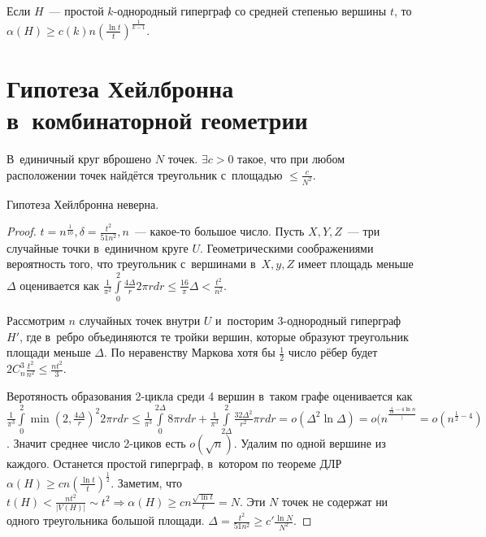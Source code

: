 \documentclass{article}
\begin{document}
\begin{corollary}
	Если $H$~--- простой $k$-однородный гиперграф со средней степенью вершины $t$,
	то $\alpha(H) \ge c(k) n \left( \frac{\ln t}{t}\right)^\frac{1}{k-1}$.
\end{corollary}

\section{Гипотеза Хейлбронна в~комбинаторной геометрии}

В~единичный круг вброшено $N$ точек. $\exists c > 0$ такое, что при любом
расположении точек найдётся треугольник с~площадью $\le \frac{c}{N^2}$.

\begin{claim}
	Гипотеза Хейлбронна неверна.
\end{claim}
\begin{proof}
	$t = n^{\frac{1}{10}}, \delta = \frac{t^2}{51n^2}, n$~--- какое-то большое
	число. Пусть $X, Y, Z$~--- три случайные точки в~единичном круге $U$.
	Геометрическими соображениями вероятность того, что треугольник с~вершинами
	в~$X, y, Z$ имеет площадь меньше $\Delta$ оценивается как
	$\frac{1}{\pi^2} \int\limits_0^2 \frac{4\Delta}{r} 2\pi r dr \le
	\frac{16}{\pi}\Delta < \frac{t^2}{n^2}$.

	Рассмотрим $n$ случайных точек внутри $U$ и~посторим 3-однородный гиперграф
	$H'$, где в~ребро объединяются те тройки вершин, которые образуют треугольник
	площади меньше $\Delta$. По неравенству Маркова хотя бы $\frac{1}{2}$ число
	рёбер будет $2C_n^3 \frac{t^2}{n^2} \le \frac{nt^2}{3}$.

	Веротяность образования 2-цикла среди 4 вершин в~таком графе оценивается как
	$\frac{1}{\pi^3} \int\limits_0^2 \min\left(2, \frac{4\Delta}{r}\right)^2 2\pi
	r dr \le \frac{1}{\pi^3} \int\limits_0^{2\Delta} 8\pi r dr +
	\frac{1}{\pi^3}\int\limits_{2\Delta}^2 \frac{32\Delta^2}{r^2}\pi r dr =
	o(\Delta^2 \ln \Delta) = o(n^\frac{\frac{4}{10}-4 \ln n}) = o(n^{\frac{1}{2} -
	4})$. Значит среднее число 2-циков есть $o(\sqrt{n})$. Удалим по одной вершине
	из каждого. Останется простой гиперграф, в~котором по теореме ДЛР $\alpha(H)
	\ge c n \left(\frac{\ln t}{t}\right)^{\frac{1}{2}}$. Заметим, что $t(H) <
	\frac{nt^2}{|V(H)|} \sim t^2 \Rightarrow \alpha(H) \ge cn \frac{\sqrt{\ln
	t}}{t} = N$. Эти $N$ точек не содержат ни одного треугольника большой площади.
	$\Delta = \frac{t^2}{51n^2} \ge c' \frac{\ln N}{N^2}$.
\end{proof}
\end{document}
